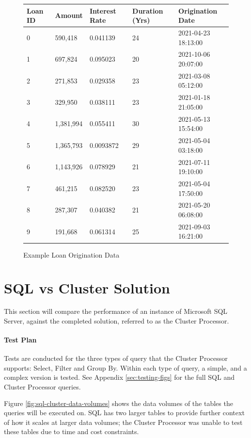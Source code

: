 \begin{figure}[ht]
	\centering
	\begin{tabular}{| l | l | l | l | l |}
		\hline
		\textbf{Loan ID} & \textbf{Amount} & \textbf{Interest Rate} & \textbf{Duration (Yrs)} & \textbf{Origination Date} \\ \hline 
		0 & 590,418 & 0.041139 & 24 & 2021-04-23 18:13:00   \\ \hline
		1 & 697,824 & 0.095023 & 20 & 2021-10-06 20:07:00    \\ \hline
		2 & 271,853 & 0.029358 & 23 & 2021-03-08 05:12:00    \\ \hline
		3 & 329,950 & 0.038111 & 23 & 2021-01-18 21:05:00    \\ \hline
		4 & 1,381,994 & 0.055411 & 30 & 2021-05-13 15:54:00  \\ \hline
		5 & 1,365,793 & 0.0093872 & 29 & 2021-05-04 03:18:00  \\ \hline
		6 & 1,143,926 & 0.078929 & 21 & 2021-07-11 19:10:00   \\ \hline
		7 & 461,215 & 0.082520 & 23 & 2021-05-04 17:50:00    \\ \hline
		8 & 287,307 & 0.040382 & 21 & 2021-05-20 06:08:00   \\ \hline
		9 & 191,668 & 0.061314 & 25 & 2021-09-03 16:21:00    \\ \hline
	\end{tabular}
	\caption{Example Loan Origination Data}
	\label{fig:fake-loan-data}
\end{figure}

\pagebreak
\section{SQL vs Cluster Solution}
This section will compare the performance of an instance of Microsoft SQL Server, against the completed solution, referred to as the Cluster Processor. 

\paragraph{Test Plan}
Tests are conducted for the three types of query that the Cluster Processor supports: Select, Filter and Group By. Within each type of query, a simple, and a complex version is tested. See Appendix \ref{sec:testing-figs} for the full SQL and Cluster Processor queries.

Figure \ref{fig:sql-cluster-data-volumes} shows the data volumes of the tables the queries will be executed on. SQL has two larger tables to provide further context of how it scales at larger data volumes; the Cluster Processor was unable to test these tables due to time and cost constraints.

